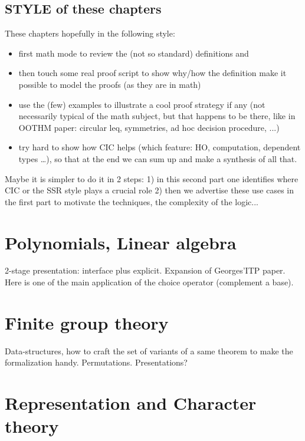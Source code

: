 \documentclass{book}
\begin{document}
\section{STYLE of these chapters}
These chapters hopefully in the following style:
\begin{itemize}
\item first math mode to review the (not so standard) definitions and
\item then touch some real proof script to show why/how the definition
  make it possible to model the proofs (as they are in math)
\item use the (few) examples to illustrate a cool proof strategy if
  any (not necessarily typical of the math subject, but that happens to
  be there, like in OOTHM paper: circular leq, symmetries, ad hoc
  decision procedure, ...)
\item try hard to show how CIC helps (which feature: HO, computation, dependent
	types \ldots), so that at the end we can sum up and make a synthesis of
	all that.
\end{itemize}

Maybe it is simpler to do it in 2 steps:
1) in this second part one identifies where CIC or the SSR style plays a
   crucial role
2) then we advertise these use cases in the first part to motivate
   the techniques, the complexity of the logic...



\chapter{Polynomials, Linear algebra}

2-stage presentation: interface plus explicit. Expansion of
Georges'ITP paper. Here is one of the main application of the choice
operator (complement a base).


\chapter{Finite group theory}

Data-structures, how to craft the set of variants of a same theorem to
make the formalization handy. Permutations. Presentations?

\chapter{Representation and Character theory}
\end{document}
